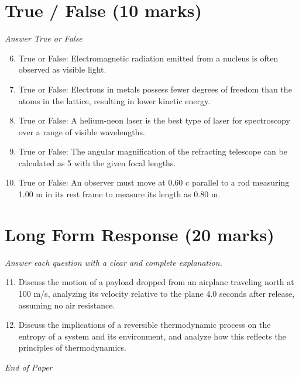 \documentclass[12pt]{article}
\begin{document}
\section*{True / False (10 marks)}
\textit{Answer True or False}
\begin{enumerate}[label=\arabic*.]
\setcounter{enumi}{5}
\item True or False: Electromagnetic radiation emitted from a nucleus is often observed as visible light.
\item True or False: Electrons in metals possess fewer degrees of freedom than the atoms in the lattice, resulting in lower kinetic energy.
\item True or False: A helium-neon laser is the best type of laser for spectroscopy over a range of visible wavelengths.
\item True or False: The angular magnification of the refracting telescope can be calculated as 5 with the given focal lengths.
\item True or False: An observer must move at 0.60 c parallel to a rod measuring 1.00 m in its rest frame to measure its length as 0.80 m.
\end{enumerate}

\section*{Long Form Response (20 marks)}
\textit{Answer each question with a clear and complete explanation.}
\begin{enumerate}[label=\arabic*.]
\setcounter{enumi}{10}
\item Discuss the motion of a payload dropped from an airplane traveling north at 100 m/s, analyzing its velocity relative to the plane 4.0 seconds after release, assuming no air resistance.
\item Discuss the implications of a reversible thermodynamic process on the entropy of a system and its environment, and analyze how this reflects the principles of thermodynamics.
\end{enumerate}

\vfill
\noindent\textit{End of Paper}
\end{document}
